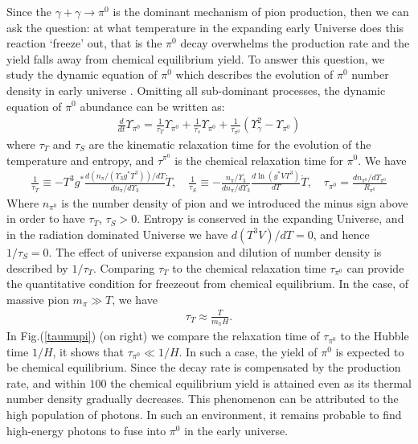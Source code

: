 \documentclass[universe,article,submit,moreauthors,pdftex,a4paper]{Definitions/mdpi}
\begin{document}
Since the  $\gamma+\gamma\to \pi^0$ is the dominant mechanism of pion production, then we can ask the question: at what temperature in the expanding early Universe does this reaction
`freeze' out, that is the $\pi^0$ decay overwhelms the production rate and the yield
falls away from chemical equilibrium yield. To answer this question, we study the dynamic equation of $\pi^0$ which describes the evolution of $\pi^0$ number density in early universe \cite{Fromerth:2012fe}. Omitting all sub-dominant processes, the dynamic equation of $\pi^0$ abundance can be written as:
\begin{align}
\frac{d}{dt}\Upsilon_{\pi^0}=\frac{1}{\tau_T}\Upsilon_{\pi^0}+\frac{1}{\tau_s}\Upsilon_{\pi^0}+\frac{1}{\tau_{\pi^0}}\left(\Upsilon^2_\gamma-\Upsilon_{\pi^0}\right)
\end{align}
where $\tau_T$ and $\tau_S$ are the kinematic relaxation time for the evolution of the temperature and entropy, and $\tau^{\pi^0}$ is the chemical relaxation time for $\pi^0$. We have
\begin{align}
\frac{1}{\tau_T}\equiv -T^3g^*\frac{d (n_{\pi}/(\Upsilon_3
g^*T^3))/dT}{dn_{\pi}/d{\Upsilon_3}}{\dot T},\label{tauT} \quad
\frac{1}{\tau_{S}}\equiv
-\frac{n_{\pi}/\Upsilon_3}{dn_{\pi}/d{\Upsilon_3}}\frac{d\ln (g^*VT^3)}{dT}
\dot{T},\quad
\tau_{\pi^0}=\frac{dn_{\pi^0}/d\Upsilon_{\pi^0}}{R_{\pi^0}} 
\end{align}
Where $n_{\pi^0}$ is the number density of pion and we introduced the minus sign above in order to have $\tau_T$, $\tau_S>0$. Entropy is conserved in the expanding Universe, and in the radiation dominated Universe we have $d(T^3V)/dT=0$, and hence $1/\tau_S=0$. The effect of universe expansion and dilution of number density is described by $1/\tau_T$. Comparing $\tau_T$ to the chemical relaxation time $\tau_{\pi^0}$ can provide the quantitative condition for freezeout from chemical equilibrium. In the case, of massive pion $m_{\pi}\gg T$, we have \cite{Kuznetsova:2009xh}
\begin{align}
\tau_T\approx\frac{T}{m_{\pi}H}.
\end{align}
 In Fig.(\ref{taumupi}) (on right)  we compare the relaxation time of $\tau_{\pi^0}$ to the Hubble time $1/H$, it shows that $\tau_{\pi^0}\ll 1/H$. In such a case, the yield of $\pi^0$ is expected to be chemical equilibrium. Since the decay rate is compensated by the production rate, and within $100$ the chemical equilibrium yield is attained even as its thermal number density gradually decreases. This phenomenon can be attributed to the high population of photons. In such an environment, it remains probable to find high-energy photons to fuse into $\pi^0$ in the early universe. 
\end{document}
